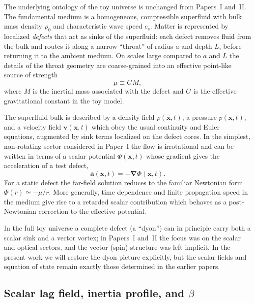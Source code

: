 \documentclass[11pt]{article}
\newcommand{\cS}{c_s}
\begin{document}
The underlying ontology of the toy universe is unchanged from
Papers~I and~II.
The fundamental medium is a homogeneous, compressible superfluid
with bulk mass density $\rho_0$ and characteristic wave speed $\cS$.
Matter is represented by localized \emph{defects} that act as sinks
of the superfluid: each defect removes fluid from the bulk and routes
it along a narrow ``throat'' of radius $a$ and depth $L$, before
returning it to the ambient medium.
On scales large compared to $a$ and $L$ the details of the throat
geometry are coarse-grained into an effective point-like source of
strength
\begin{equation}
  \mu \equiv GM,
\end{equation}
where $M$ is the inertial mass associated with the defect and $G$
is the effective gravitational constant in the toy model.

The superfluid bulk is described by a density field $\rho(\mathbf{x},t)$,
a pressure $p(\mathbf{x},t)$, and a velocity field
$\mathbf{v}(\mathbf{x},t)$ which obey the usual continuity and Euler
equations, augmented by sink terms localized on the defect cores.
In the simplest, non-rotating sector considered in Paper~I the flow
is irrotational and can be written in terms of a scalar potential
$\Phi(\mathbf{x},t)$ whose gradient gives the acceleration of a test
defect,
\begin{equation}
  \mathbf{a}(\mathbf{x},t) = -\bm{\nabla} \Phi(\mathbf{x},t).
\end{equation}
For a static defect the far-field solution reduces to the familiar
Newtonian form $\Phi(r) \simeq -\mu/r$.
More generally, time dependence and finite propagation speed in the
medium give rise to a retarded scalar contribution which behaves as
a post-Newtonian correction to the effective potential.

In the full toy universe a complete defect (a ``dyon'') can in principle
carry both a scalar sink and a vector vortex; in Papers~I and~II the
focus was on the scalar and optical sectors, and the vector (spin)
structure was left implicit.
In the present work we will restore the dyon picture explicitly,
but the scalar fields and equation of state remain exactly those
determined in the earlier papers.

\subsection{Scalar lag field, inertia profile, and \texorpdfstring{$\beta$}{beta}}
\label{subsec:inputs-scalar-beta}
\end{document}
